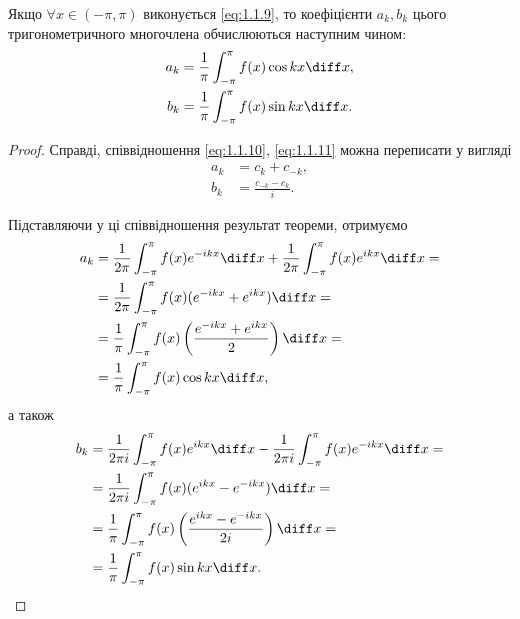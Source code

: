 \begin{corollary}
    Якщо $\forall x \in (-\pi, \pi)$ виконується \eqref{eq:1.1.9}, то коефіцієнти $a_k, b_k$ цього тригонометричного многочлена обчислюються наступним чином:
    \begin{align}
        \label{eq:1.1.15}
        a_k &= \frac{1}{\pi} \int_{-\pi}^{\pi} f(x) \cos kx \diff x, \\
        \label{eq:1.1.16}
        b_k &= \frac{1}{\pi} \int_{-\pi}^{\pi} f(x) \sin kx \diff x.
    \end{align}
\end{corollary}
\begin{proof}
    Справді, співвідношення \eqref{eq:1.1.10}, \eqref{eq:1.1.11} можна переписати у вигляді
    \begin{align}
        a_k &= c_k + c_{-k}, \\
        b_k &= \frac{c_{-k} - c_k}{i}.
    \end{align}
    
    Підставляючи у ці співвідношення результат теореми, отримуємо
    \begin{equation}
        \begin{aligned}
            a_k 
            &= \frac{1}{2 \pi} \int_{-\pi}^{\pi} f(x) e^{-ikx} \diff x + \frac{1}{2 \pi} \int_{-\pi}^{\pi} f(x) e^{ikx} \diff x = \\
            &= \frac{1}{2 \pi} \int_{-\pi}^{\pi} f(x) ( e^{-ikx} + e^{ikx}) \diff x = \\
            &= \frac{1}{\pi} \int_{-\pi}^{\pi} f(x) \left( \frac{e^{-ikx} + e^{ikx}}{2} \right) \diff x = \\
            &= \frac{1}{\pi} \int_{-\pi}^{\pi} f(x) \cos kx \diff x,
        \end{aligned}
    \end{equation}
    а також
    \begin{equation}
        \begin{aligned}
            b_k 
            &= \frac{1}{2 \pi i} \int_{-\pi}^{\pi} f(x) e^{ikx} \diff x - \frac{1}{2 \pi i} \int_{-\pi}^{\pi} f(x) e^{-ikx} \diff x = \\
            &= \frac{1}{2 \pi i} \int_{-\pi}^{\pi} f(x) ( e^{ikx} - e^{-ikx}) \diff x = \\
            &= \frac{1}{\pi} \int_{-\pi}^{\pi} f(x) \left( \frac{e^{ikx} - e^{-ikx}}{2 i} \right) \diff x = \\
            &= \frac{1}{\pi} \int_{-\pi}^{\pi} f(x) \sin kx \diff x.
        \end{aligned}
    \end{equation}
\end{proof}

